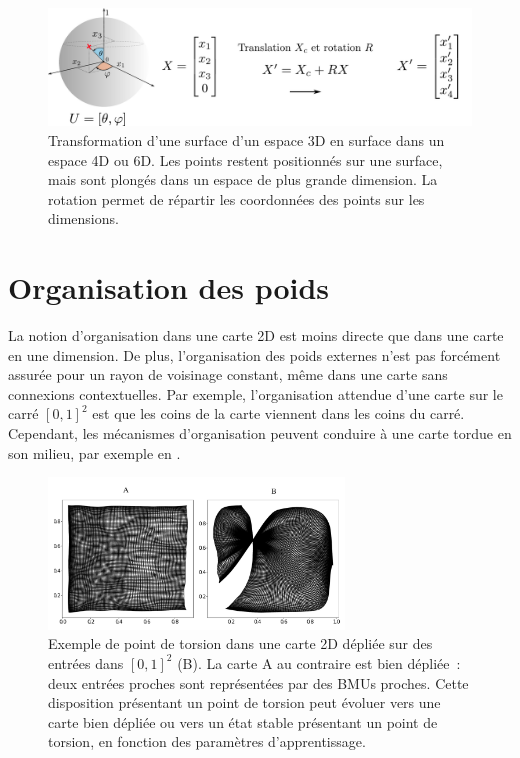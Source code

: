 \documentclass[../main]{subfiles}
\begin{document}
\begin{figure}
	\includegraphics[width=\textwidth]{sphere_inputs.pdf}
	\caption{Transformation d'une surface d'un espace 3D en surface dans un espace 4D ou 6D. Les points restent positionnés sur une surface, mais sont plongés dans un espace de plus grande dimension. La rotation permet de répartir les coordonnées des points sur les dimensions. \label{fig:sphere_inputs}}
\end{figure}

\section{Organisation des poids}

La notion d'organisation dans une carte 2D est moins directe que dans une carte en une dimension.
De plus, l'organisation des poids externes n'est pas forcément assurée pour un rayon de voisinage constant, même dans une carte sans connexions contextuelles. Par exemple, l'organisation attendue d'une carte sur le carré $[0,1]^2$ est que les coins de la carte viennent dans les coins du carré. Cependant, les mécanismes d'organisation peuvent conduire à une carte tordue en son milieu, par exemple en \label{fig:torsion}.

\begin{figure}
	\centering\includegraphics[width=0.7\textwidth]{we_cub_example.pdf}
	\caption{Exemple de point de torsion dans une carte 2D dépliée sur des entrées dans $[0,1]^2$ (B). La carte A au contraire est bien dépliée~: deux entrées proches sont représentées par des BMUs proches. Cette disposition présentant un point de torsion peut évoluer vers une carte bien dépliée ou vers un état stable présentant un point de torsion, en fonction des paramètres d'apprentissage. \label{fig:torsion}
	}
\end{figure}
\end{document}
